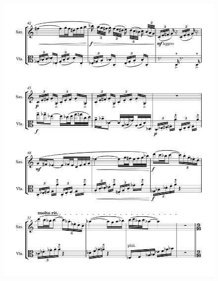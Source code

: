 \begin{figure}[htbp]
    \centering
	\includegraphics[width=6.5in]{figures/Sax_Viola_25.pdf}
\end{figure}

